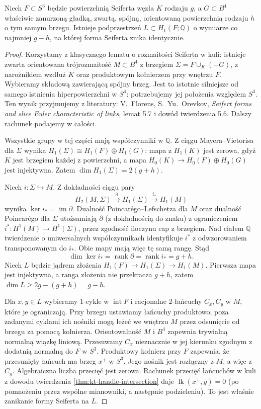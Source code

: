 \begin{lemat}
\label{lem:kt-taylor-isotropic}
Niech $F\subset S^3$ będzie powierzchnią Seiferta
węzła $K$ rodzaju $g$, a $G\subset B^4$ właściwie
zanurzoną gładką, zwartą, spójną, orientowaną
powierzchnią rodzaju $h$ o tym samym brzegu.
Istnieje podprzestrzeń $L\subset H_1(F;\mathbb Q)$
o wymiarze co najmniej $g-h$, na której forma
Seiferta znika identycznie.
\end{lemat}
\begin{proof}
Korzystamy z klasycznego lematu o rozmaitości
Seiferta w kuli: istnieje zwarta orientowana
trójrozmaitość $M\subset B^4$ z brzegiem
$\Sigma=F\cup_K(-G)$, z narożnikiem wzdłuż $K$
oraz produktowym kołnierzem przy wnętrzu $F$.
Wybieramy składową zawierającą spójny brzeg.
Jest to istotnie silniejsze od samego istnienia
hiperpowierzchni w $S^4$: potrzebujemy jej
położenia względem $S^3$. Ten wynik przyjmujemy
z literatury: V.~Florens, S.~Yu.~Orevkov,
\emph{Seifert forms and slice Euler characteristic of links},
lemat 5.7 i dowód twierdzenia 5.6.
Dalszy rachunek podajemy w całości.

Wszystkie grupy w tej części mają współczynniki
w $\mathbb Q$. Z ciągu Mayera--Vietorisa
dla $\Sigma$ wynika
$H_1(\Sigma)\cong H_1(F)\oplus H_1(G)$:
mapa z $H_1(K)$ jest zerowa, gdyż $K$
jest brzegiem każdej z powierzchni, a mapa
$H_0(K)\to H_0(F)\oplus H_0(G)$ jest
injektywna. Zatem $\dim H_1(\Sigma)=2(g+h)$.

Niech $i:\Sigma\hookrightarrow M$.
Z dokładności ciągu pary
\[
H_2(M,\Sigma)\xrightarrow{\partial} H_1(\Sigma)
\xrightarrow{i_*}H_1(M)
\]
wynika $\ker i_*=\operatorname{im}\partial$.
Dualność Poincarégo--Lefschetza dla $M$
oraz dualność Poincarégo dla $\Sigma$
utożsamiają $\partial$ (z dokładnością do znaku)
z ograniczeniem $i^*:H^1(M)\to H^1(\Sigma)$,
przez zgodność iloczynu cap z brzegiem.
Nad ciałem $\mathbb Q$ twierdzenie
o uniwersalnych współczynnikach identyfikuje
$i^*$ z odwzorowaniem transponowanym do $i_*$.
Obie mapy mają więc tę samą rangę. Stąd
\[
\dim\ker i_*=\operatorname{rank}\partial
=\operatorname{rank}i_* =g+h.
\]
Niech $L$ będzie jądrem złożenia
$H_1(F)\to H_1(\Sigma)\to H_1(M)$.
Pierwsza mapa jest injektywna, a ranga złożenia
nie przekracza $g+h$, zatem
$\dim L\ge 2g-(g+h)=g-h$.

Dla $x,y\in L$ wybieramy 1-cykle w
$\operatorname{int}F$ i racjonalne 2-łańcuchy
$C_x,C_y$ w $M$, które je ograniczają.
Przy brzegu ustawiamy łańcuchy produktowo;
poza zadanymi cyklami ich nośniki mogą
leżeć we wnętrzu $M$ przez odsunięcie od
brzegu za pomocą kołnierza.
Orientowalność $M$ i $B^4$ zapewnia trywialną
normalną wiązkę liniową. Przesuwamy $C_x$
nieznacznie w jej kierunku zgodnym z dodatnią
normalną do $F$ w $S^3$. Produktowy kołnierz
przy $F$ zapewnia, że przesunięty łańcuch
ma brzeg $x^+$ w $S^3$. Jego nośnik
jest rozłączny z $M$, a więc z $C_y$.
Algebraiczna liczba przecięć jest zerowa.
Rachunek przecięć łańcuchów w kuli
z dowodu twierdzenia \ref{thm:kt-handle-intersection}
daje $\operatorname{lk}(x^+,y)=0$
(po pomnożeniu przez wspólne mianowniki,
a następnie podzieleniu). To jest właśnie
zanikanie formy Seiferta na $L$.
\end{proof}

